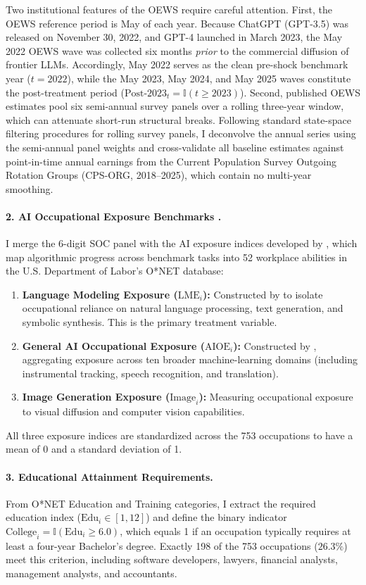\documentclass[12pt]{article}
\begin{document}
Two institutional features of the OEWS require careful attention. First, the OEWS reference period is May of each year. Because ChatGPT (GPT-3.5) was released on November 30, 2022, and GPT-4 launched in March 2023, the May 2022 OEWS wave was collected six months \textit{prior} to the commercial diffusion of frontier LLMs. Accordingly, May 2022 serves as the clean pre-shock benchmark year ($t = 2022$), while the May 2023, May 2024, and May 2025 waves constitute the post-treatment period ($\text{Post-2023}_t = \mathbb{I}(t \ge 2023)$). Second, published OEWS estimates pool six semi-annual survey panels over a rolling three-year window, which can attenuate short-run structural breaks. Following standard state-space filtering procedures for rolling survey panels, I deconvolve the annual series using the semi-annual panel weights and cross-validate all baseline estimates against point-in-time annual earnings from the Current Population Survey Outgoing Rotation Groups (CPS-ORG, 2018--2025), which contain no multi-year smoothing.

\paragraph{2. AI Occupational Exposure Benchmarks \citep{felten2021, felten2023}.}
I merge the 6-digit SOC panel with the AI exposure indices developed by \citet{felten2021, felten2023}, which map algorithmic progress across benchmark tasks into 52 workplace abilities in the U.S. Department of Labor's O*NET database:
\begin{enumerate}
    \item \textbf{Language Modeling Exposure ($\text{LME}_i$):} Constructed by \citet{felten2023} to isolate occupational reliance on natural language processing, text generation, and symbolic synthesis. This is the primary treatment variable.
    \item \textbf{General AI Occupational Exposure ($\text{AIOE}_i$):} Constructed by \citet{felten2021}, aggregating exposure across ten broader machine-learning domains (including instrumental tracking, speech recognition, and translation).
    \item \textbf{Image Generation Exposure ($\text{Image}_i$):} Measuring occupational exposure to visual diffusion and computer vision capabilities.
\end{enumerate}
All three exposure indices are standardized across the 753 occupations to have a mean of 0 and a standard deviation of 1.

\paragraph{3. Educational Attainment Requirements.}
From O*NET Education and Training categories, I extract the required education index ($\text{Edu}_i \in [1, 12]$) and define the binary indicator $\text{College}_i = \mathbb{I}(\text{Edu}_i \ge 6.0)$, which equals 1 if an occupation typically requires at least a four-year Bachelor's degree. Exactly 198 of the 753 occupations ($26.3\%$) meet this criterion, including software developers, lawyers, financial analysts, management analysts, and accountants.
\end{document}
